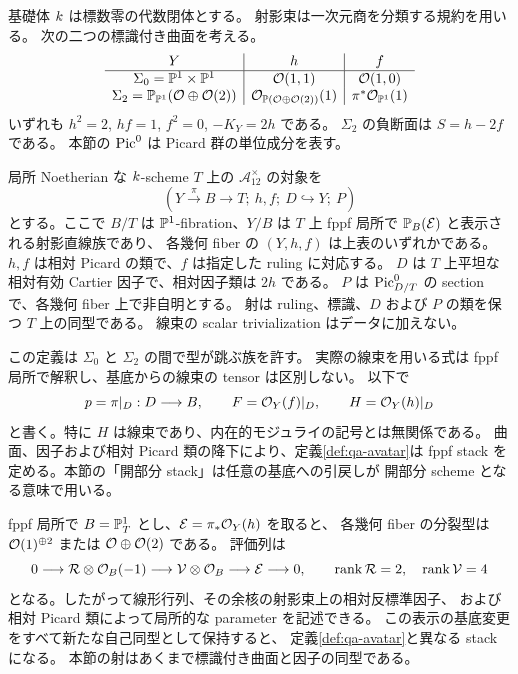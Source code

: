 基礎体 $k$ は標数零の代数閉体とする。
射影束は一次元商を分類する規約を用いる。
次の二つの標識付き曲面を考える。
\[
\begin{array}{c|c|c}
Y&h&f\\\hline
\Sigma _0=\mathbb P^1\times\mathbb P^1&\mathcal O(1,1)&\mathcal O(1,0)\\
\Sigma _2=\mathbb P_{\mathbb P^1}(\mathcal O\oplus\mathcal O(2))&\mathcal O_{\mathbb P(\mathcal O\oplus\mathcal O(2))}(1)&\pi^*\mathcal O_{\mathbb P^1}(1)
\end{array}
\]
いずれも $h^2=2$, $hf=1$, $f^2=0$, $-K_Y=2h$ である。
$\Sigma _2$ の負断面は $S=h-2f$ である。
本節の $\operatorname{Pic}^0$ は Picard 群の単位成分を表す。

\begin{definition}
\label{def:qa-avatar}
局所 Noetherian な $k$-scheme $T$ 上の
$\mathcal A_{12}^{\times}$ の対象を
\[
 (Y\xrightarrow{\pi}B\longrightarrow T;\ h,f;\ D\hookrightarrow Y;\ P)
\]
とする。ここで $B/T$ は $\mathbb P^1$-fibration、$Y/B$ は
$T$ 上 fppf 局所で $\mathbb P_B(\mathcal E)$ と表示される射影直線族であり、
各幾何 fiber の $(Y,h,f)$ は上表のいずれかである。
$h,f$ は相対 Picard の類で、$f$ は指定した ruling に対応する。
$D$ は $T$ 上平坦な相対有効 Cartier 因子で、相対因子類は $2h$ である。
$P$ は $\operatorname{Pic}^0_{D/T}$ の section で、各幾何 fiber 上で非自明とする。
射は ruling、標識、$D$ および $P$ の類を保つ $T$ 上の同型である。
線束の scalar trivialization はデータに加えない。
\end{definition}

この定義は $\Sigma _0$ と $\Sigma _2$ の間で型が跳ぶ族を許す。
実際の線束を用いる式は fppf 局所で解釈し、基底からの線束の tensor は区別しない。
以下で
\[
 p=\pi|_D:D\longrightarrow B,\qquad F=\mathcal O_Y(f)|_D,\qquad H=\mathcal O_Y(h)|_D
\]
と書く。特に $H$ は線束であり、内在的モジュライの記号とは無関係である。
曲面、因子および相対 Picard 類の降下により、定義\ref{def:qa-avatar}は
fppf stack を定める。本節の「開部分 stack」は任意の基底への引戻しが
開部分 scheme となる意味で用いる。

\begin{remark}
fppf 局所で $B=\mathbb P^1_T$ とし、$\mathcal E=\pi_*\mathcal O_Y(h)$ を取ると、
各幾何 fiber の分裂型は $\mathcal O(1)^{\oplus2}$ または $\mathcal O\oplus\mathcal O(2)$ である。
評価列は
\[
 0\longrightarrow \mathcal R\otimes\mathcal O_B(-1)
 \longrightarrow \mathcal V\otimes\mathcal O_B
 \longrightarrow\mathcal E\longrightarrow0,
 \qquad\operatorname{rank}\mathcal R=2,\quad\operatorname{rank}\mathcal V=4
\]
となる。したがって線形行列、その余核の射影束上の相対反標準因子、
および相対 Picard 類によって局所的な parameter を記述できる。
この表示の基底変更をすべて新たな自己同型として保持すると、
定義\ref{def:qa-avatar}と異なる stack になる。
本節の射はあくまで標識付き曲面と因子の同型である。
\end{remark}

